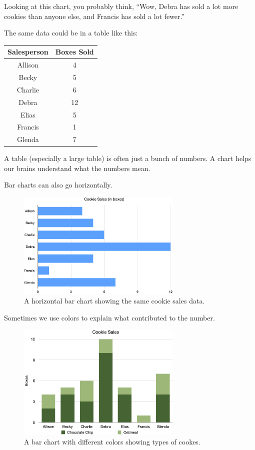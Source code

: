 Looking at this chart, you probably think, ``Wow, Debra has sold a lot
more cookies than anyone else, and Francis has sold a lot fewer.''

The same data could be in a table like this:

\begin{center}
  \begin{tabular}{c | c}
    Salesperson & Boxes Sold \\
    \hline
    Allison & 4 \\
    Becky & 5 \\
    Charlie & 6\\
    Debra & 12\\
    Elias & 5\\
    Francis & 1\\
    Glenda & 7
  \end{tabular}
\end{center}

A table (especially a large table) is often just a bunch of
numbers. A chart helps our brains understand what the numbers mean.

Bar charts can also go horizontally.
\begin{figure}[htbp]
    \centering
    \includegraphics[width=0.7\textwidth]{HorizontalBarCookies.png}
    \caption{A horizontal bar chart showing the same cookie sales data.}
    \label{fig:horizontalBar}
\end{figure}

Sometimes we use colors to explain what contributed to the number.
\begin{figure}[htbp]
    \centering
    \includegraphics[width=0.7\textwidth]{TypesCookieBar.png}
    \caption{A bar chart with different colors showing types of cookes.}
    \label{fig:coloredBar}
\end{figure}

